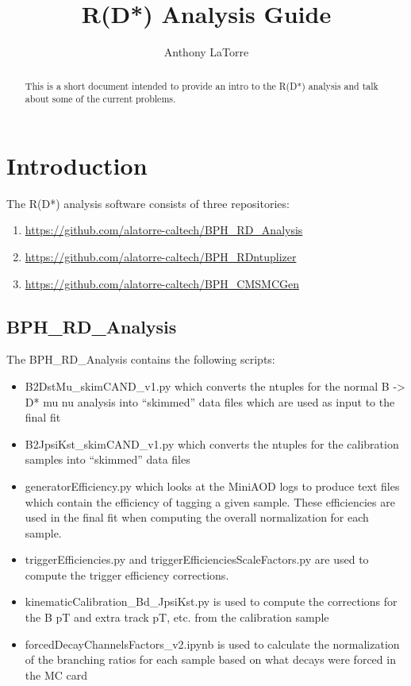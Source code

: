 \documentclass[12pt]{article}
\title{R(D*) Analysis Guide}
\author{Anthony LaTorre}
\begin{document}
\maketitle
\begin{abstract}
This is a short document intended to provide an intro to the R(D*) analysis and talk about some of the current problems.
\end{abstract}
\section{Introduction}
The R(D*) analysis software consists of three repositories:
\begin{enumerate}
\item \href{BPH\_RD\_Analysis}{https://github.com/alatorre-caltech/BPH_RD_Analysis}
\item \href{BPH\_RDntuplizer}{https://github.com/alatorre-caltech/BPH_RDntuplizer}
\item \href{BPH\_CMSMCGen}{https://github.com/alatorre-caltech/BPH_CMSMCGen}
\end{enumerate}
\subsection{BPH\_RD\_Analysis}
The BPH\_RD\_Analysis contains the following scripts:
\begin{itemize}
\item B2DstMu\_skimCAND\_v1.py which converts the ntuples for the normal B -> D* mu nu analysis into ``skimmed'' data files which are used as input to the final fit
\item B2JpsiKst\_skimCAND\_v1.py which converts the ntuples for the calibration samples into ``skimmed'' data files
\item generatorEfficiency.py which looks at the MiniAOD logs to produce text files which contain the efficiency of tagging a given sample. These efficiencies are used in the final fit when computing the overall normalization for each sample.
\item triggerEfficiencies.py and triggerEfficienciesScaleFactors.py are used to compute the trigger efficiency corrections.
\item kinematicCalibration_Bd_JpsiKst.py is used to compute the corrections for the B pT and extra track pT, etc. from the calibration sample
\item forcedDecayChannelsFactors_v2.ipynb is used to calculate the normalization of the branching ratios for each sample based on what decays were forced in the MC card
\end{itemize}
\end{document}
